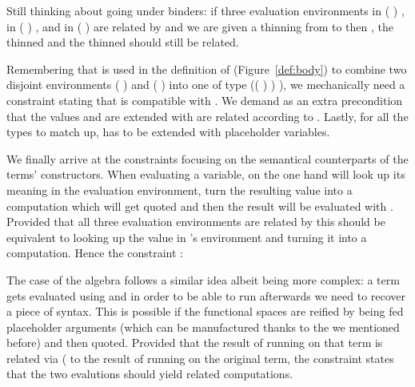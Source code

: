 
Still thinking about going under binders: if three evaluation environments
 in {(\AB{$\Gamma$} )  \AB{$\Delta$}},  in
{(\AB{$\Delta$} )  \AB{$\Theta$}}, and  in {(\AB{$\Gamma$} )  \AB{$\Theta$}}
are related by  and we are given a thinning \AB{$\sigma$} from \AB{$\Theta$} to \AB{$\Omega$}
then , the thinned  and the thinned  should still be related.


Remembering that \AF{\_>>\_} is used in the definition of  (Figure~\ref{def:body}) to
combine two disjoint environments {( )  } and
{( )  } into one of type
{(( \AF{++} ) )  )}, we mechanically need a
constraint stating that \AF{\_>>\_} is compatible with . We demand
as an extra precondition that the values  and  are extended
with are related according to . Lastly, for all the types to match up,
 has to be extended with placeholder variables.


We finally arrive at the constraints focusing on the semantical counterparts
of the terms' constructors. When evaluating a variable, on the one hand 
will look up its meaning in the evaluation environment, turn the resulting value into
a computation which will get quoted and then the result will be evaluated with .
Provided that all three evaluation environments are related by  this should
be equivalent to looking up the value in 's environment and turning it into a
computation. Hence the constraint :


The case of the algebra follows a similar idea albeit being more complex:
a term gets evaluated using  and in order to be able to run 
afterwards we need to recover a piece of syntax. This is possible if the
 functional spaces are reified by being fed placeholder  arguments
(which can be manufactured thanks to the  we mentioned before) and
then quoted. Provided that the result of running  on that term is
related via {  (  } to the result
of running  on the original term, the  constraint states
that the two evalutions should yield related computations.

